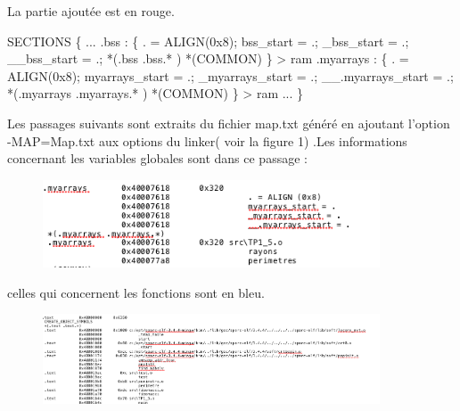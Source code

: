 \documentclass[12pt,a4paper]{article}
\begin{document}
La partie ajoutée est en rouge.
\begin{framed}
 {\selectfont
SECTIONS
\{\newline
...\newline
 .bss   :\newline
  \{\newline
    . = ALIGN(0x8);\newline
    bss\_start = .;\newline
    \_bss\_start = .;\newline
    \_\_bss\_start = .;\newline
    *(.bss .bss.* )\newline
    *(COMMON)\newline
  \}  > ram\newline
  \color{red}
  .myarrays  :\newline
\{\newline
  . = ALIGN(0x8);\newline
    myarrays\_start = .;\newline
    \_myarrays\_start = .;\newline
    \_\_.myarrays\_start = .;\newline
    *(.myarrays .myarrays.* )\newline
    *(COMMON)\newline
\}  > ram\newline
  \color{black}
...\newline
\}\newline
}
\end{framed}

Les passages suivants sont  extraits du fichier map.txt généré en ajoutant l'option  -MAP=Map.txt aux options du linker( voir la figure 1) .Les informations concernant les variables globales sont dans ce passage :
\begin{framed}
\begin{figure}[H]
\includegraphics[width=10cm]{infovar.png} 

	\end{figure}
	\end{framed}
	\noindent
celles qui concernent les fonctions sont en bleu.
\begin{framed}
\begin{figure}[H]
\includegraphics[width=10cm]{infoFunct.png}

	\end{figure}
		\end{framed}
\end{document}
